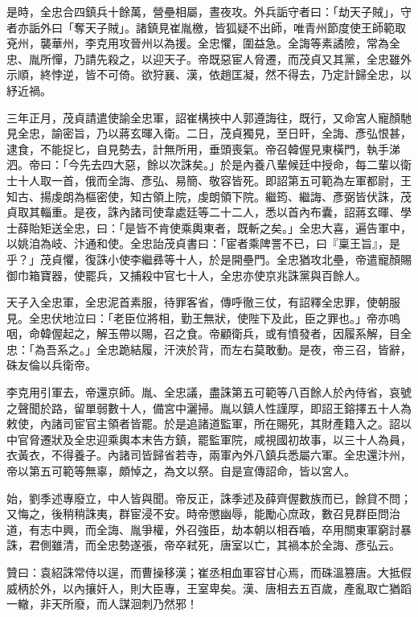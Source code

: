 \begin{pinyinscope}
 是時，全忠合四鎮兵十餘萬，營壘相屬，晝夜攻。外兵詬守者曰：「劫天子賊」，守者亦詬外曰「奪天子賊」。諸鎮見崔胤檄，皆狐疑不出師，唯青州節度使王師範取兗州，襲華州，李克用攻晉州以為援。全忠懼，圍益急。全誨等素譎險，常為全忠、胤所憚，乃請先殺之，以迎天子。帝既惡宦人脅遷，而茂貞又其黨，全忠雖外示順，終悖逆，皆不可倚。欲狩襄、漢，依趙匡凝，然不得去，乃定計歸全忠，以紓近禍。



 三年正月，茂貞請遣使諭全忠軍，詔崔構挾中人郭遵誨往，既行，又命宮人寵顏馳見全忠，諭密旨，乃以蔣玄暉入衛。二日，茂貞獨見，至日旰，全誨、彥弘恨甚，逮食，不能捉匕，自見勢去，計無所用，垂頭喪氣。帝召韓偓見東橫門，執手涕泗。帝曰：「今先去四大惡，餘以次誅矣。」於是內養八輩候廷中授命，每二輩以衛士十人取一首，俄而全誨、彥弘、易簡、敬容皆死。即詔第五可範為左軍都尉，王知古、揚虔朗為樞密使，知古領上院，虔朗領下院。繼筠、繼誨、彥弼皆伏誅，茂貞取其輜重。是夜，誅內諸司使韋處廷等二十二人，悉以首內布囊，詔蔣玄暉、學士薛貽矩送全忠，曰：「是皆不肯使乘輿東者，既斬之矣。」全忠大喜，遍告軍中，以姚洎為岐、汴通和使。全忠詒茂貞書曰：「宦者乘陴詈不已，曰『稟王旨』，是乎？」茂貞懼，復誅小使李繼彞等十人，於是開壘門。全忠猶攻北壘，帝遣寵顏賜御巾箱寶器，使罷兵，又捕殺中官七十人，全忠亦使京兆誅黨與百餘人。



 天子入全忠軍，全忠泥首素服，待罪客省，傳呼徹三仗，有詔釋全忠罪，使朝服見。全忠伏地泣曰：「老臣位將相，勤王無狀，使陛下及此，臣之罪也。」帝亦嗚咽，命韓偓起之，解玉帶以賜，召之食。帝顧衛兵，或有憤發者，因履系解，目全忠：「為吾系之。」全忠跪結履，汗浹於背，而左右莫敢動。是夜，帝三召，皆辭，硃友倫以兵衛帝。



 李克用引軍去，帝還京師。胤、全忠議，盡誅第五可範等八百餘人於內侍省，哀號之聲聞於路，留單弱數十人，備宮中灑掃。胤以鎮人性謹厚，即詔王鎔擇五十人為敕使，內諸司宦官主領者皆罷。於是追諸道監軍，所在賜死，其財產籍入之。詔以中官脅遷狀及全忠迎乘輿本末告方鎮，罷監軍院，咸視國初故事，以三十人為員，衣黃衣，不得養子。內諸司皆歸省若寺，兩軍內外八鎮兵悉屬六軍。全忠還汴州，帝以第五可範等無辜，頗悼之，為文以祭。自是宣傳詔命，皆以宮人。



 始，劉季述專廢立，中人皆與聞。帝反正，誅季述及薛齊偓數族而已，餘貸不問；又悔之，後稍稍誅夷，群宦浸不安。時帝懲幽辱，能勵心庶政，數召見群臣問治道，有志中興，而全誨、胤爭權，外召強臣，劫本朝以相吞嚙，卒用關東軍窮討暴誅，君側雖清，而全忠勢遂張，帝卒弒死，唐室以亡，其禍本於全誨、彥弘云。



 贊曰：袁紹誅常侍以逞，而曹操移漢；崔丞相血軍容甘心焉，而硃溫篡唐。大抵假威柄於外，以內攘奸人，則大臣專，王室卑矣。漢、唐相去五百歲，產亂取亡猶蹈一轍，非天所廢，而人謀洄刺乃然邪！



\end{pinyinscope}